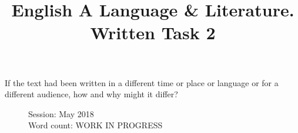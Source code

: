 \documentclass[a4paper,12pt]{article}
\title{English A Language \& Literature. Written Task 2}
\date{}
\author{}
\begin{document}
\maketitle
\begin{center}
  If the text had been written in a different time or place or language or for a different audience, how and why might it differ?
\end{center}
\begin{flushleft}
  \begin{figure}
    Session: May 2018\\
    Word count: WORK IN PROGRESS\\
    \end{figure}
\end{flushleft}
\newpage
\end{document}
